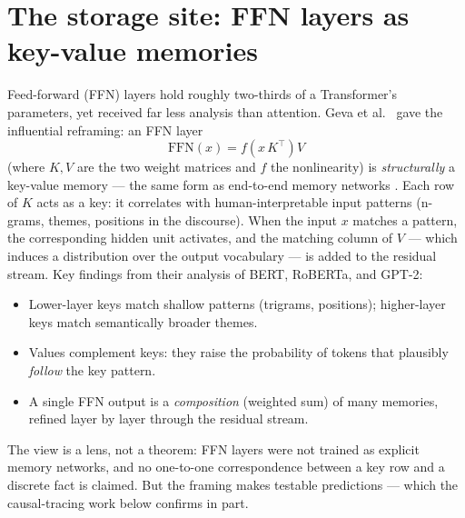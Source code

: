 \documentclass[11pt]{article}
\begin{document}
\section{The storage site: FFN layers as key-value memories}
Feed-forward (FFN) layers hold roughly two-thirds of a Transformer's parameters, yet received far less analysis than attention. Geva et al.\ \cite{geva2021transformer} gave the influential reframing: an FFN layer
\begin{equation}
\mathrm{FFN}(x) = f(x \, K^\top) V
\end{equation}
(where $K, V$ are the two weight matrices and $f$ the nonlinearity) is \emph{structurally} a key-value memory --- the same form as end-to-end memory networks \cite{sukhbaatar2015end}. Each row of $K$ acts as a key: it correlates with human-interpretable input patterns (n-grams, themes, positions in the discourse). When the input $x$ matches a pattern, the corresponding hidden unit activates, and the matching column of $V$ --- which induces a distribution over the output vocabulary --- is added to the residual stream. Key findings from their analysis of BERT, RoBERTa, and GPT-2:
\begin{itemize}[noitemsep]
  \item Lower-layer keys match shallow patterns (trigrams, positions); higher-layer keys match semantically broader themes.
  \item Values complement keys: they raise the probability of tokens that plausibly \emph{follow} the key pattern.
  \item A single FFN output is a \emph{composition} (weighted sum) of many memories, refined layer by layer through the residual stream.
\end{itemize}
The view is a lens, not a theorem: FFN layers were not trained as explicit memory networks, and no one-to-one correspondence between a key row and a discrete fact is claimed. But the framing makes testable predictions --- which the causal-tracing work below confirms in part.
\end{document}
